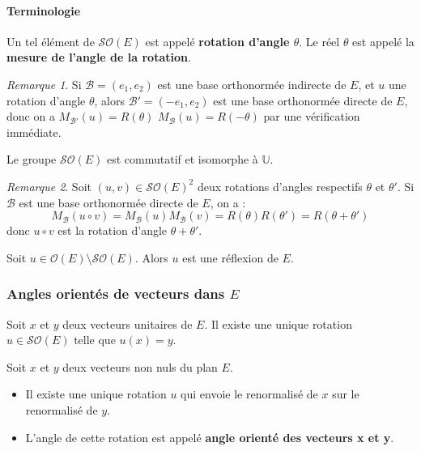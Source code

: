 \documentclass[french]{article}
\newcommand{\U}{\mathbb{U}}
\theoremstyle{plain}
\theoremstyle{definition}
\theoremstyle{remark}
\newtheorem*{rmq}{Remarque}
\begin{document}
\paragraph{Terminologie} Un tel élément de $\mathcal{SO}(E)$ est appelé \textbf{rotation d'angle $\theta$}. Le réel $\theta$ est appelé la \textbf{mesure de l'angle de la rotation}.

\begin{rmq}
	Si $\mathcal{B}=(e_1,e_2)$ est une base orthonormée indirecte de $E$, et $u$ une rotation d'angle $\theta$, alors $\mathcal{B}'=(-e_1,e_2)$ est une base orthonormée directe de $E$, donc on a $M_{\mathcal{B}'}(u)=R(\theta)$ $M_{\mathcal{B}}(u)=R(-\theta)$ par une vérification immédiate.
\end{rmq}

\begin{thm}{}
	Le groupe $\mathcal{SO}(E)$ est commutatif et isomorphe à $\U$.
\end{thm}

\begin{rmq}
	Soit $(u,v)\in\mathcal{SO}(E)^2$ deux rotations d'angles respectifs $\theta$ et $\theta'$. Si $\mathcal{B}$ est une base orthonormée directe de $E$, on a : $$M_\mathcal{B}(u\circ v)=M_\mathcal{B}(u)M_\mathcal{B}(v)=R(\theta)R(\theta')=R(\theta+\theta')$$ donc $u\circ v$ est la rotation d'angle $\theta+\theta'$.
\end{rmq}

\begin{thm}{}
	Soit $u\in\mathcal{O}(E)\setminus\mathcal{SO}(E)$. Alors $u$ est une réflexion de $E$.
\end{thm}

\subsubsection*{Angles orientés de vecteurs dans $E$}

\begin{thm}{}
	Soit $x$ et $y$ deux vecteurs unitaires de $E$. Il existe une unique rotation $u\in\mathcal{SO}(E)$ telle que $u(x)=y$.
\end{thm}

\begin{dfn}
	Soit $x$ et $y$ deux vecteurs non nuls du plan $E$.
	\begin{itemize}
		\item Il existe une unique rotation $u$ qui envoie le renormalisé de $x$ sur le renormalisé de $y$.
		\item L'angle de cette rotation est appelé \textbf{angle orienté des vecteurs x et y}.
	\end{itemize}
\end{dfn}
\end{document}
